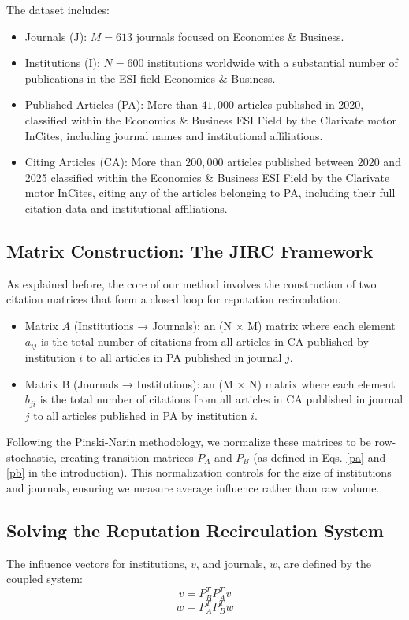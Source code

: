 \documentclass[10pt]{article}
\begin{document}
The dataset includes:
\begin{itemize}
\item Journals (J): $M =613$ journals focused on Economics \& Business.
\item Institutions (I): $N =600$ institutions worldwide with a substantial number of publications in the ESI field Economics \& Business.
\item Published Articles (PA): More than $41,000$ articles published in 2020, classified within the Economics \& Business ESI Field by the Clarivate motor InCites, including journal names and institutional affiliations.
\item Citing Articles (CA): More than $200,000$ articles published between 2020 and 2025  classified within the Economics \& Business ESI Field by the Clarivate motor InCites, citing any of the  articles belonging to PA, including their full citation data and institutional affiliations.
    \end{itemize}
\subsection{Matrix Construction: The JIRC Framework}
As explained before, the core of our method involves the construction of two citation matrices that form a closed loop for reputation recirculation.

\begin{itemize}
\item Matrix $A$ (Institutions → Journals): an (N × M) matrix where each element $a_{ij}$ is the total number of citations from all articles in CA published by institution $i$ to all articles in PA published in journal $j$.
\item Matrix B (Journals → Institutions): an (M × N) matrix where each element \(b_{ji}\) is the total number of citations from all articles in CA published in journal $j$ to all articles published in PA by institution $i$.
    \end{itemize}
Following the Pinski-Narin methodology, we normalize these matrices to be row-stochastic, creating transition matrices \(P_A\) and \(P_B\) (as defined in Eqs. \ref{pa}  and \ref{pb} in the introduction). This normalization controls for the size of institutions and journals, ensuring we measure average influence rather than raw volume.
\subsection{Solving the Reputation Recirculation System}
The influence vectors for institutions, $v$, and journals, $w$, are defined by the coupled system:
\[ v = P_B^T P_A^T v \]
\[ w = P_A^T P_B^T w \]
\end{document}
